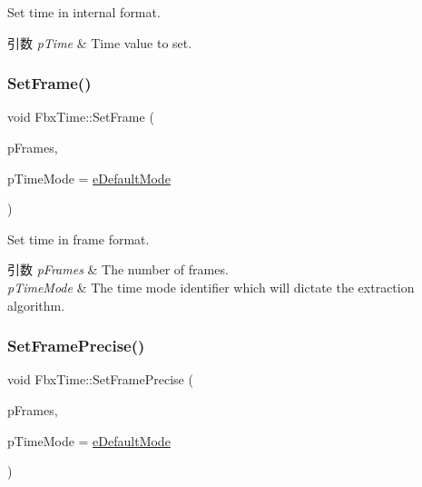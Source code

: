 Set time in internal format. 
\begin{DoxyParams}{引数}
{\em p\+Time} & Time value to set. \\
\hline
\end{DoxyParams}
\mbox{\label{class_fbx_time_ac695b38f72d522f8d592404b6f301fe4}} 
\subsubsection{\texorpdfstring{Set\+Frame()}{SetFrame()}}
{\footnotesize\ttfamily void Fbx\+Time\+::\+Set\+Frame (\begin{DoxyParamCaption}\item[{\hyperlink{fbxtypes_8h_ac34da60c22b0a7e1156e5480da7d71f1}{Fbx\+Long\+Long}}]{p\+Frames,  }\item[{\hyperlink{class_fbx_time_acc529b00a0e8d4c3da3702449ca93031}{E\+Mode}}]{p\+Time\+Mode = {\ttfamily \hyperlink{class_fbx_time_acc529b00a0e8d4c3da3702449ca93031a1490a2efc4429bf125761d75f2aa06a6}{e\+Default\+Mode}} }\end{DoxyParamCaption})}

Set time in frame format. 
\begin{DoxyParams}{引数}
{\em p\+Frames} & The number of frames. \\
\hline
{\em p\+Time\+Mode} & The time mode identifier which will dictate the extraction algorithm. \\
\hline
\end{DoxyParams}
\mbox{\label{class_fbx_time_aab76f3007f42dbeb80fc552c9e4175be}} 
\subsubsection{\texorpdfstring{Set\+Frame\+Precise()}{SetFramePrecise()}}
{\footnotesize\ttfamily void Fbx\+Time\+::\+Set\+Frame\+Precise (\begin{DoxyParamCaption}\item[{\hyperlink{fbxtypes_8h_a171e72a1c46fc15c1a6c9c31948c1c5b}{Fbx\+Double}}]{p\+Frames,  }\item[{\hyperlink{class_fbx_time_acc529b00a0e8d4c3da3702449ca93031}{E\+Mode}}]{p\+Time\+Mode = {\ttfamily \hyperlink{class_fbx_time_acc529b00a0e8d4c3da3702449ca93031a1490a2efc4429bf125761d75f2aa06a6}{e\+Default\+Mode}} }\end{DoxyParamCaption})}

